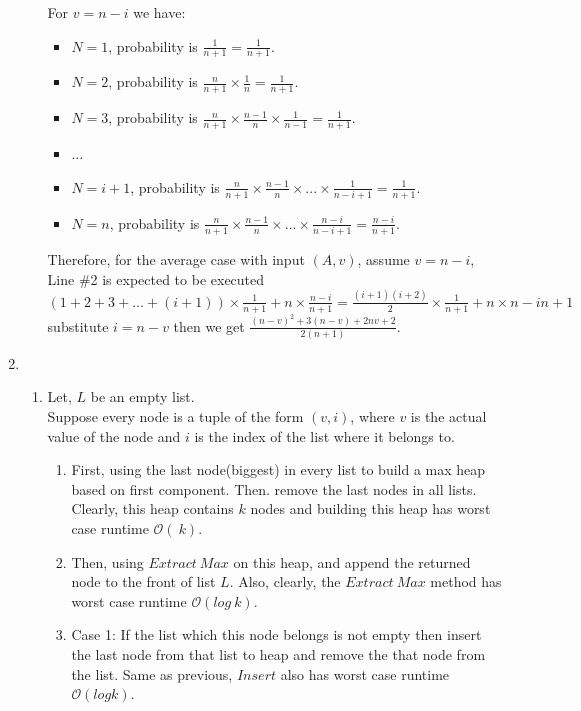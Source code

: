 \documentclass[11pt,twoside]{article}
\begin{document}
\begin{enumerate}[leftmargin=0pt]
\begin{enumerate}[topsep=0pt]
			For $v = n-i$ we have:\\
			\begin{itemize} [label={}]
				\item	 $N=1$, probability is $\frac {1}{n+1} = \frac {1}{n+1}$.
				\item	 $N=2$, probability is $\frac {n}{n+1} \times \frac {1}{n} = \frac {1}{n+1}$.
				\item	 $N=3$, probability is $\frac {n}{n+1} \times \frac {n-1}{n} \times \frac {1}{n-1} 
					= \frac {1}{n+1}$.
				\item ...
				\item	 $N= i+1$, probability is $\frac {n}{n+1} \times \frac {n-1}{n} \times...
					\times  \frac {1}{n-i+1} = \frac {1}{n+1}$.
				\item	 $N= n $, probability is $\frac {n}{n+1} \times \frac {n-1}{n} \times...
					\times  \frac {n-i}{n-i+1} = \frac {n-i}{n+1}$. 
			\end{itemize}
			Therefore, for the average case with input $(A, v)$, assume $v = n-i$, Line \#2 is 
			expected to be executed $(1+ 2+3 + ...+ (i+1))\times \frac {1}{n+1} + n \times \frac{n-i}{n+1}
			= \frac{(i+1)(i+2)}{2} \times \frac{1}{n+1} + n \times{n-i}{n+1}$ substitute $i = n-v$ then we get
			$\frac{(n-v)^2 + 3(n-v) +2nv +2}{2(n+1)}$.
		\end{enumerate}
\newpage

\item	
		\begin{enumerate}[topsep=0pt]
		
		\item	Let, $L$ be an empty list.\\
			Suppose every node is a tuple  of the form $(v, i)$, where $v$ is the actual value of the node and 
			$i$ is the index of the list where it belongs to.
			\begin{enumerate}
			 \item First, using the last node(biggest) in every list to build a max heap based on first 
			 component.
			 Then. remove the last nodes in all lists. Clearly, this heap contains $k$ nodes and building this 
			 heap has worst case runtime $\mathcal{O}(\ k)$.
			 \item  Then, using $Extract \ Max$ on this heap, and append the returned node to the front of list
			 $L$.  Also, clearly, the $Extract \ Max$ method has worst case runtime $\mathcal{O}(log \ k)$.
			 
			\item  Case 1: If the list which this node belongs is not empty then insert the last node from
				  that list to heap and remove the that node from the list. Same as previous, $Insert$ 
				  also has worst case  runtime $\mathcal{O}(log k)$.
				  

\end{enumerate}
\end{enumerate}
\end{enumerate}
\end{document}
